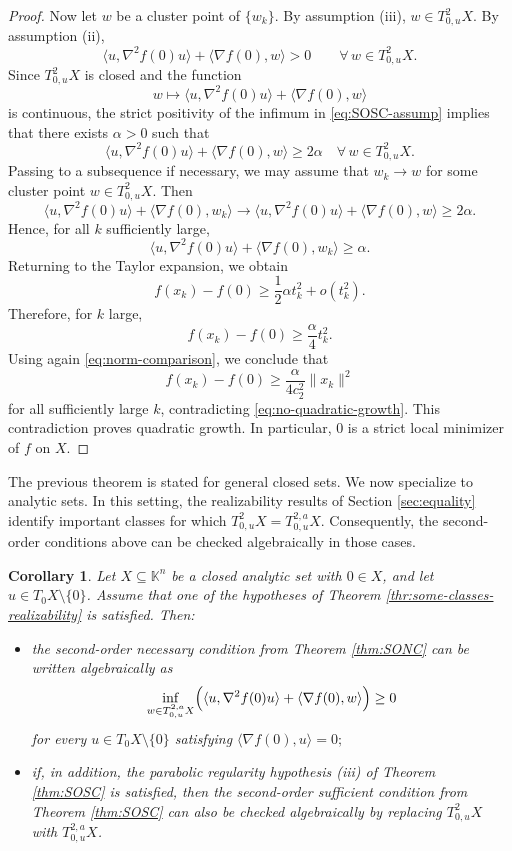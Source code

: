 \documentclass[10pt,reqno]{amsart}
\theoremstyle{break-italic}
\theoremstyle{break-italic}
\theoremstyle{break-italic}
\theoremstyle{break-italic}
\theoremstyle{break-italic}
\theoremstyle{break-italic}
\theoremstyle{break-italic}
\theoremstyle{break-italic}
\newtheorem{corollary}[satz]{Corollary}
\theoremstyle{break-roman}
\theoremstyle{standard}
\theoremstyle{varthm-roman}
\theoremstyle{varthm-italic}
\theoremstyle{varthm-roman-break}
\theoremstyle{varthm-italic-break}
\theoremstyle{varthm-roman-no-punctuation}
\theoremstyle{varthm-italic-no-punctuation}
\numberwithin{equation}{section}
\begin{document}
\begin{proof}
Now let $w$ be a cluster point of $\{w_k\}$. By assumption {\rm(iii)},
\(
w\in T^2_{0,u}X.
\)
By assumption {\rm(ii)},
\[
\langle u,\nabla^2 f(0)u\rangle + \langle \nabla f(0),w\rangle >0
\qquad \forall\,w\in T^2_{0,u}X.
\]
Since $T^2_{0,u}X$ is closed and the function
\[
w\longmapsto \langle u,\nabla^2 f(0)u\rangle + \langle \nabla f(0),w\rangle
\]
is continuous, the strict positivity of the infimum in \eqref{eq:SOSC-assump}
implies that there exists $\alpha>0$ such that
\[
\langle u,\nabla^2 f(0)u\rangle + \langle \nabla f(0),w\rangle \ge 2\alpha
\quad \forall\,w\in T^2_{0,u}X.
\]
Passing to a subsequence if necessary, we may assume that $w_k\to w$ for some
cluster point $w\in T^2_{0,u}X$. Then
\[
\langle u,\nabla^2 f(0)u\rangle + \langle \nabla f(0),w_k\rangle
\to
\langle u,\nabla^2 f(0)u\rangle + \langle \nabla f(0),w\rangle
\ge 2\alpha.
\]
Hence, for all $k$ sufficiently large,
\[
\langle u,\nabla^2 f(0)u\rangle + \langle \nabla f(0),w_k\rangle \ge \alpha.
\]
Returning to the Taylor expansion, we obtain
\[
f(x_k)-f(0)\ge \frac12\alpha t_k^2+o(t_k^2).
\]
Therefore, for $k$ large,
\[
f(x_k)-f(0)\ge \frac{\alpha}{4}t_k^2.
\]
Using again \eqref{eq:norm-comparison}, we conclude that
\[
f(x_k)-f(0)\ge \frac{\alpha}{4c_2^2}\|x_k\|^2
\]
for all sufficiently large $k$, contradicting \eqref{eq:no-quadratic-growth}.
This contradiction proves quadratic growth. In particular, $0$ is a strict local
minimizer of $f$ on $X$.
\end{proof}

The previous theorem is stated for general closed sets. We now specialize to
analytic sets. In this setting, the realizability results of Section \ref{sec:equality} identify
important classes for which
\(
T^2_{0,u}X=T^{2,a}_{0,u}X.
\)
Consequently, the second-order conditions above can be checked algebraically in
those cases.

\begin{corollary}\label{cor:algebraic-checking}
Let $X\subseteq\mathbb K^n$ be a closed analytic set with $0\in X$, and let
$u\in T_0X\setminus\{0\}$. Assume that one of the hypotheses of
Theorem \ref{thr:some-classes-realizability} is satisfied. Then:
\begin{itemize}
\item[(i)] the second-order necessary condition from Theorem \ref{thm:SONC} can
be written algebraically as
\[
\inf_{w\in T^{2,a}_{0,u}X}
\Bigl(
\langle u,\nabla^2 f(0)u\rangle
+
\langle \nabla f(0),w\rangle
\Bigr)\ge 0
\]
for every $u\in T_0X\setminus\{0\}$ satisfying
\(
\langle \nabla f(0),u\rangle =0;
\)
\item[(ii)] if, in addition, the parabolic regularity hypothesis
{\rm(iii)} of Theorem \ref{thm:SOSC} is satisfied, then the second-order
sufficient condition from Theorem \ref{thm:SOSC} can also be checked
algebraically by replacing $T^2_{0,u}X$ with $T^{2,a}_{0,u}X$.
\end{itemize}
\end{corollary}
\end{document}

